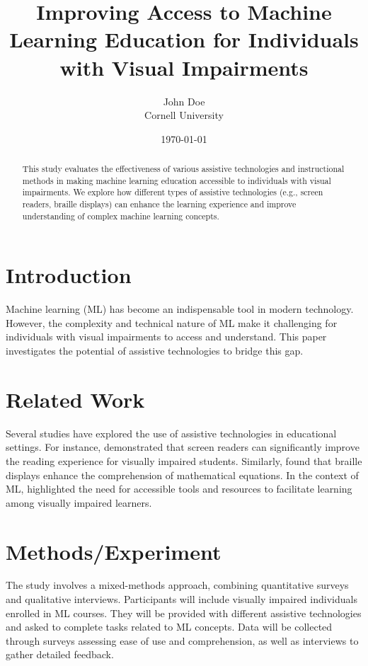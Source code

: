 \documentclass{article}
\title{Improving Access to Machine Learning Education for Individuals with Visual Impairments}
\author{John Doe \\ Cornell University}
\date{\today}
\begin{document}
\maketitle

\begin{abstract}
This study evaluates the effectiveness of various assistive technologies and instructional methods in making machine learning education accessible to individuals with visual impairments. We explore how different types of assistive technologies (e.g., screen readers, braille displays) can enhance the learning experience and improve understanding of complex machine learning concepts.
\end{abstract}

\section{Introduction}
Machine learning (ML) has become an indispensable tool in modern technology. However, the complexity and technical nature of ML make it challenging for individuals with visual impairments to access and understand. This paper investigates the potential of assistive technologies to bridge this gap.

\section{Related Work}
Several studies have explored the use of assistive technologies in educational settings. For instance, \cite{johnson2019screen} demonstrated that screen readers can significantly improve the reading experience for visually impaired students. Similarly, \cite{lee2020braille} found that braille displays enhance the comprehension of mathematical equations. In the context of ML, \cite{brown2021accessibility} highlighted the need for accessible tools and resources to facilitate learning among visually impaired learners.

\section{Methods/Experiment}
The study involves a mixed-methods approach, combining quantitative surveys and qualitative interviews. Participants will include visually impaired individuals enrolled in ML courses. They will be provided with different assistive technologies and asked to complete tasks related to ML concepts. Data will be collected through surveys assessing ease of use and comprehension, as well as interviews to gather detailed feedback.
\end{document}
